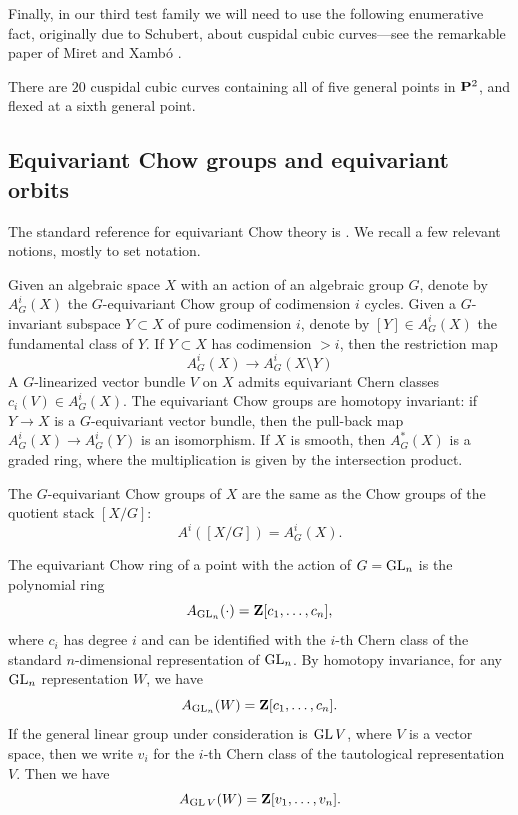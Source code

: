 \documentclass[12pt,reqno]{amsart}
\renewcommand{\to}{{\longrightarrow}}
\numberwithin{equation}{section}
\begin{document}
Finally, in our third test family we will need to use the following
enumerative fact, originally due to Schubert, about cuspidal cubic
curves---see the remarkable paper of Miret and Xamb\'o
\cite{miret1989geometry}.

 \begin{theorem}
   \label{theorem:Schubert} There are $20$ cuspidal cubic curves
   containing all of five general points in $\P^{2}$, and flexed at a
   sixth general point.
 \end{theorem}
\subsection{Equivariant Chow groups and equivariant orbits}
The standard reference for equivariant Chow theory is \cite{edi.gra:98}.
We recall a few relevant notions, mostly to set notation.

Given an algebraic space $X$ with an action of an algebraic group $G$,
denote by $A^i_G(X)$ the $G$-equivariant Chow group of codimension $i$
cycles.  Given a $G$-invariant subspace $Y \subset X$ of pure
codimension $i$, denote by $[Y] \in A^i_G(X)$ the fundamental class of
$Y$.  If $Y \subset X$ has codimension $> i$, then the restriction map
\[ A^i_G(X) \to A^i_G(X \setminus Y)\] A $G$-linearized vector bundle
$V$ on $X$ admits equivariant Chern classes $c_i(V) \in A^i_G(X)$.
The equivariant Chow groups are homotopy invariant: if $Y \to X$ is a
$G$-equivariant vector bundle, then the pull-back map
$A^i_G(X) \to A^i_G(Y)$ is an isomorphism.  If $X$ is smooth, then
$A^*_G(X)$ is a graded ring, where the multiplication is given by the
intersection product.

The $G$-equivariant Chow groups of $X$ are the same as the Chow groups
of the quotient stack $[X/G]$:
\[ A^i\left( [X/G] \right) = A^i_G(X).\]

The equivariant Chow ring of a point with the action of $G = \GL_n$ is
the polynomial ring
\[ A_{\GL_n}(\cdot) = \Z[c_1,\dots, c_n],\] where $c_i$ has
degree $i$ and can be identified with the $i$-th Chern class of the
standard $n$-dimensional representation of $\GL_n$.  By homotopy
invariance, for any $\GL_n$ representation $W$, we have
\[ A_{\GL_n}(W) = \Z[c_1,\dots,c_n].\] If the general linear
group under consideration is $\GL V$, where $V$ is a vector space,
then we write $v_i$ for the $i$-th Chern class of the tautological
representation $V$.  Then we have
\[ A_{\GL V}(W) = \Z[v_1,\dots,v_n].\]
\end{document}
